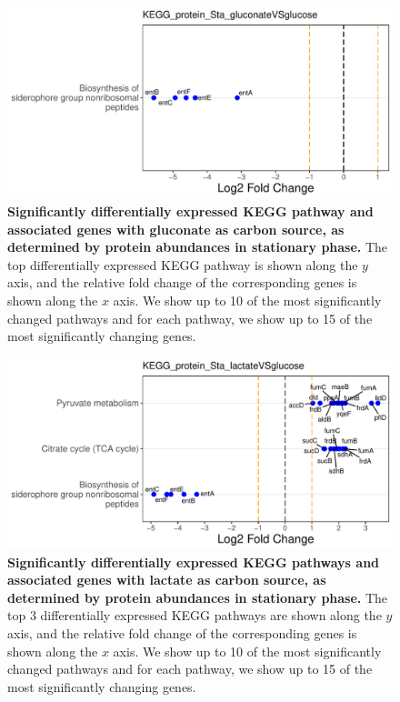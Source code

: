 \documentclass[a4paper]{article}
\begin{document}
\clearpage
\begin{figure}
	\includegraphics[width=1.0\textwidth]{../../d_figures/KEGG07_protein_Sta_gluconateVSglucose_withTitle.pdf}
	\caption[Significantly differentially expressed KEGG pathway for protein samples in stationary phase tested for gluconate against glucose]
	{\textbf{Significantly differentially expressed KEGG pathway and associated genes with gluconate as carbon source, as determined by protein abundances in stationary phase.} The top differentially expressed KEGG pathway is shown along the $y$ axis, and the relative fold change of the corresponding genes is shown along the $x$ axis. We show up to 10 of the most significantly changed pathways and for each pathway, we show up to 15 of the most significantly changing genes.}
\end{figure}

\clearpage
\begin{figure}
	\includegraphics[width=1.0\textwidth]{../../d_figures/KEGG08_protein_Sta_lactateVSglucose_withTitle.pdf}
	\caption[Significantly differentially expressed KEGG pathways for protein samples in stationary phase tested for lactate against glucose]
	{\textbf{Significantly differentially expressed KEGG pathways and associated genes with lactate as carbon source, as determined by protein abundances in stationary phase.} The top 3 differentially expressed KEGG pathways are shown along the $y$ axis, and the relative fold change of the corresponding genes is shown along the $x$ axis. We show up to 10 of the most significantly changed pathways and for each pathway, we show up to 15 of the most significantly changing genes.}
\end{figure}
\end{document}
